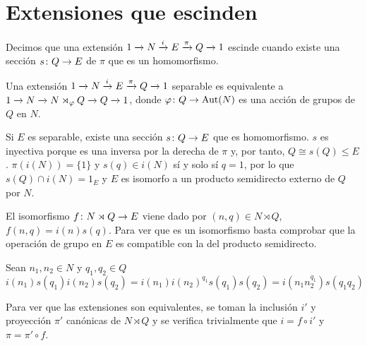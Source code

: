 
\section{Extensiones que escinden}\label{sec:split}


\begin{definicion}	
	Decimos que una extensión $\extension i \pi N E Q$ escinde cuando existe una sección $\homo s Q E$ de $\pi$ que es un homomorfismo.
\end{definicion}

\begin{teorema}\label{splitext}
	Una extensión $\extension i \pi N E Q$ separable es equivalente a $\extension {} {} N {N\rtimes_{\varphi} Q} Q$, donde $\homo \varphi Q \Aut(N)$ es una acción de grupos de $Q$ en $N$. %
	\begin{demostracion}
		Si $E$ es separable, existe una sección $\homo s Q E$ que es homomorfismo. $s$ es inyectiva porque es una inversa por la derecha de $\pi$ y, por tanto, $Q\cong s(Q) \leq E$.
		$\pi (i(N)) = \{1\}$ y $s(q)\in i(N)$ sí y solo sí $q = 1$, por lo que $s(Q)\cap i(N) = {1_E}$ y $E$ es isomorfo a un producto semidirecto externo de $Q$ por $N$.
		
		El isomorfismo $\homo f {N\rtimes Q} E$ viene dado por $(n,q)\in N\rtimes Q$, $f(n,q) = i(n)s(q)$. Para ver que es un isomorfismo basta comprobar que la operación de grupo en $E$ es compatible con la del producto semidirecto.
		
		Sean $n_1,n_2\in N$ y $q_1,q_2\in Q$
		\begin{equation*}
			i(n_1)s(q_1)i(n_2)s(q_2) = i(n_1)i(n_2)^{q_1}s(q_1)s(q_2) = i(n_1 n_2^{q_1})s(q_1q_2) 
		\end{equation*}
		
		Para ver que las extensiones son equivalentes, se toman la inclusión $i'$ y proyección $\pi'$ canónicas de $N\rtimes Q$ y se verifica trivialmente que $i=f \circ i'$ y $\pi = \pi' \circ f$.
	\end{demostracion}
\end{teorema}


